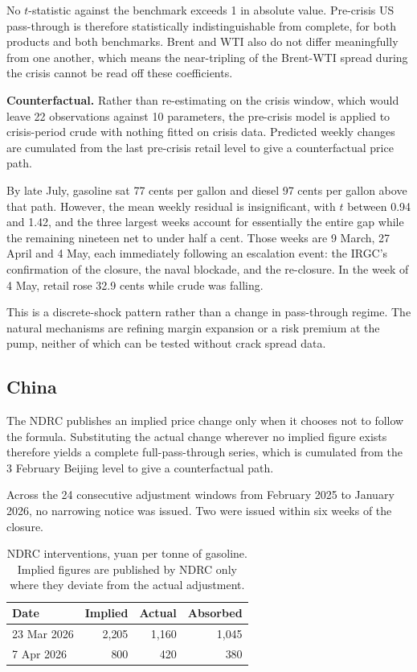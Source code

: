 \documentclass[11pt]{article}
\begin{document}
No $t$-statistic against the benchmark exceeds 1 in absolute
value. Pre-crisis US pass-through is therefore statistically
indistinguishable from complete, for both products and both benchmarks.
Brent and WTI also do not differ meaningfully from one another, which
means the near-tripling of the Brent-WTI spread during the crisis cannot
be read off these coefficients.

\textbf{Counterfactual.} Rather than re-estimating on the crisis window,
which would leave 22 observations against 10 parameters, the pre-crisis
model is applied to crisis-period crude with nothing fitted on crisis
data. Predicted weekly changes are cumulated from the last pre-crisis
retail level to give a counterfactual price path.

By late July, gasoline sat 77 cents per gallon and diesel 97 cents per
gallon above that path. However, the mean weekly residual is
insignificant, with $t$ between 0.94 and 1.42, and the three largest
weeks account for essentially the entire gap while the remaining
nineteen net to under half a cent. Those weeks are 9 March, 27 April
and 4 May, each immediately following an escalation event: the IRGC's
confirmation of the closure, the naval blockade, and the re-closure. In
the week of 4 May, retail rose 32.9 cents while crude was falling.

This is a discrete-shock pattern rather than a change in pass-through
regime. The natural mechanisms are refining margin expansion or a risk
premium at the pump, neither of which can be tested without crack spread
data.

\subsection*{China}

The NDRC publishes an implied price change only when it chooses not to
follow the formula. Substituting the actual change wherever no implied
figure exists therefore yields a complete full-pass-through series,
which is cumulated from the 3 February Beijing level to give a
counterfactual path.

Across the 24 consecutive adjustment windows from February 2025 to
January 2026, no narrowing notice was issued. Two were issued within
six weeks of the closure.

\begin{table}[htbp]
\centering\small
\begin{tabular}{lrrr}
\toprule
\textbf{Date} & \textbf{Implied} & \textbf{Actual} & \textbf{Absorbed} \\
\midrule
23 Mar 2026 & 2{,}205 & 1{,}160 & 1{,}045 \\
7 Apr 2026 & 800 & 420 & 380 \\
\bottomrule
\end{tabular}
\caption{NDRC interventions, yuan per tonne of gasoline. Implied figures are published by NDRC only where they deviate from the actual adjustment.}
\label{tab:ndrc}
\end{table}
\end{document}
